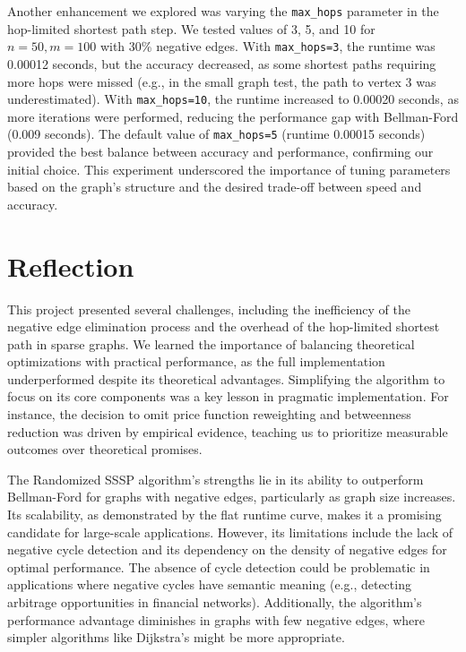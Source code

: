 \documentclass[12pt]{article}
\begin{document}
Another enhancement we explored was varying the \texttt{max\_hops} parameter in the hop-limited shortest path step. We tested values of 3, 5, and 10 for \(n=50, m=100\) with 30\% negative edges. With \texttt{max\_hops=3}, the runtime was 0.00012 seconds, but the accuracy decreased, as some shortest paths requiring more hops were missed (e.g., in the small graph test, the path to vertex 3 was underestimated). With \texttt{max\_hops=10}, the runtime increased to 0.00020 seconds, as more iterations were performed, reducing the performance gap with Bellman-Ford (0.009 seconds). The default value of \texttt{max\_hops=5} (runtime 0.00015 seconds) provided the best balance between accuracy and performance, confirming our initial choice. This experiment underscored the importance of tuning parameters based on the graph’s structure and the desired trade-off between speed and accuracy.

\section{Reflection}
This project presented several challenges, including the inefficiency of the negative edge elimination process and the overhead of the hop-limited shortest path in sparse graphs. We learned the importance of balancing theoretical optimizations with practical performance, as the full implementation underperformed despite its theoretical advantages. Simplifying the algorithm to focus on its core components was a key lesson in pragmatic implementation. For instance, the decision to omit price function reweighting and betweenness reduction was driven by empirical evidence, teaching us to prioritize measurable outcomes over theoretical promises.

The Randomized SSSP algorithm’s strengths lie in its ability to outperform Bellman-Ford for graphs with negative edges, particularly as graph size increases. Its scalability, as demonstrated by the flat runtime curve, makes it a promising candidate for large-scale applications. However, its limitations include the lack of negative cycle detection and its dependency on the density of negative edges for optimal performance. The absence of cycle detection could be problematic in applications where negative cycles have semantic meaning (e.g., detecting arbitrage opportunities in financial networks). Additionally, the algorithm’s performance advantage diminishes in graphs with few negative edges, where simpler algorithms like Dijkstra’s might be more appropriate.
\end{document}
